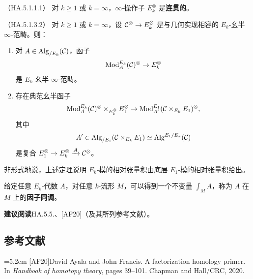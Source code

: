 \begin{theorem}\label{L26-4.22}（HA.5.1.1.1）
对 $k\ge1$ 或 $k=\infty$，$\infty$-操作子 $E_{k}^{\otimes}$ 是\textbf{连贯的}。
\end{theorem}


\begin{theorem}\label{L26-4.23}（HA.5.1.3.2）
对 $k\ge1$ 或 $k=\infty$，设 $\mathcal{C}^{\otimes}\to E_{k}^{\otimes}$ 是与几何实现相容的 $E_{k}$-幺半 $\infty$-范畴。则：
\begin{enumerate}[label=(\arabic*),leftmargin=2.4em,itemsep=0.1em]
\item 对 $A\in\operatorname{Alg}_{/E_{k}}(\mathcal{C})$，函子
\[
\operatorname{Mod}^{E_{k}}_{A}(\mathcal{C})^{\otimes}\to E_{k}^{\otimes}
\]
是 $E_{k}$-幺半 $\infty$-范畴。
\item 存在典范幺半函子
\[
\operatorname{Mod}^{E_{k}}_{A}(\mathcal{C})^{\otimes}\times_{E_{k}^{\otimes}}E_{1}^{\otimes}\to\operatorname{Mod}^{E_{1}}_{A^{\prime}}(\mathcal{C}\times_{E_{k}}E_{1})^{\otimes},
\]
其中
\[
A^{\prime}\in\operatorname{Alg}_{/E_{1}}(\mathcal{C}\times_{E_{k}}E_{1})\simeq\operatorname{Alg}^{E_{1}/E_{k}}(\mathcal{C})
\]
是复合 $E_{1}^{\otimes}\to E_{k}^{\otimes}\xrightarrow{A}\mathcal{C}^{\otimes}$。
\end{enumerate}
\end{theorem}

\begin{remark}\label{L26-4.24}
非形式地说，上述定理说明 $E_{k}$-模的相对张量积由底层 $E_{1}$-模的相对张量积给出。
\end{remark}


\nitem\label{L26-A.1} 给定任意 $E_{k}$-代数 $A$，对任意 $k$-流形 $M$，可以得到一个不变量 $\int_{M}A$，称为 $A$ 在 $M$ 上的\textbf{因子同调}。


\nitem\label{L26-A.2} \textbf{建议阅读}\quad HA.5.5.、[AF20]（及其所列参考文献）。

\subsection*{参考文献}
\par\noindent\hangindent=5.2em [AF20]\hspace{0.6em}David Ayala and John Francis. A factorization homology primer. In \emph{Handbook of homotopy theory}, pages 39--101. Chapman and Hall/CRC, 2020.
